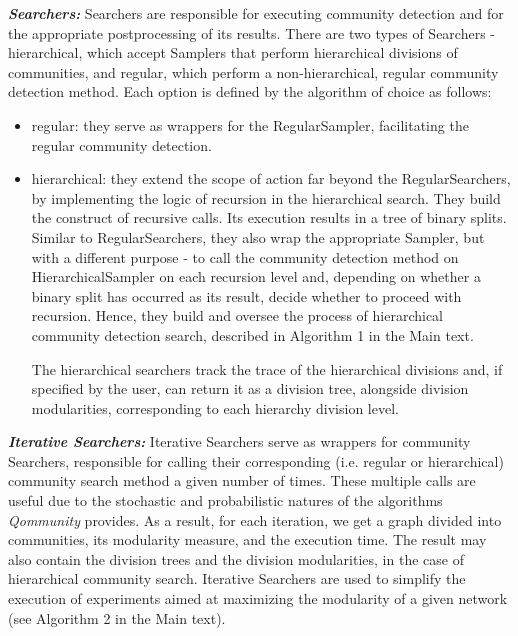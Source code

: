 \documentclass[pdflatex,sn-mathphys-num]{sn-jnl}%
\begin{document}
\textit{\textbf{Searchers:}} Searchers are responsible for executing community detection and for the appropriate postprocessing of its results.  There are two types of Searchers - hierarchical, which accept Samplers that perform hierarchical divisions of communities, and regular, which perform a non-hierarchical, regular community detection method. Each option is defined by the algorithm of choice 
as follows: 
\begin{itemize}
\item regular: they serve as wrappers for the RegularSampler, facilitating the regular community detection.
\item hierarchical: they extend the scope of action far beyond the RegularSearchers, by implementing the logic of recursion in the hierarchical search.  They build the construct of recursive calls. Its execution results in a tree of binary splits. Similar to RegularSearchers, they also wrap the appropriate Sampler, but with a different purpose - to call the community detection method on HierarchicalSampler on each recursion level and, depending on whether a binary split has occurred as its result, decide whether to proceed with recursion. Hence, they build and oversee the process of hierarchical community detection search, described in Algorithm 1 in the Main text.

The hierarchical searchers track the trace of the hierarchical divisions and, if specified by the user, can return it as a division tree, alongside division modularities, corresponding to each hierarchy division level.
\end{itemize}

\textit{\textbf{Iterative Searchers:}}  Iterative Searchers serve as wrappers for community Searchers, responsible for calling their corresponding (i.e. regular or hierarchical) community search method a given number of times. These multiple calls are useful due to the stochastic and probabilistic natures of the algorithms \textit{Qommunity} provides.
As a result, for each iteration, we get a graph divided into communities, its modularity measure, and the execution time. The result may also contain the division trees and the division modularities, in the case of hierarchical community search. Iterative Searchers are used to simplify the execution of experiments aimed at maximizing the modularity of a given network (see Algorithm 2 in the Main text).
\end{document}

